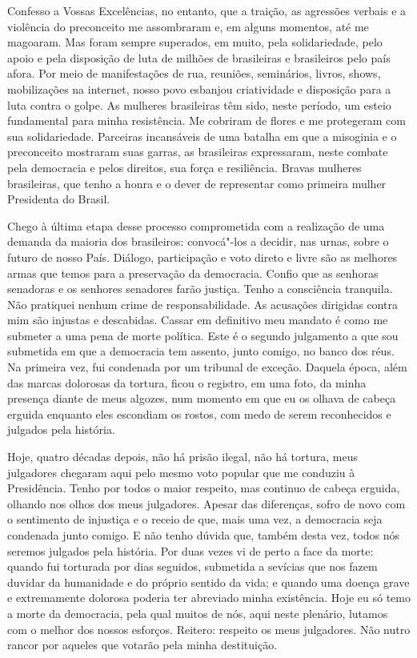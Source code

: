 Confesso a Vossas Excelências, no entanto, que a traição, as agressões
verbais e a violência do preconceito me assombraram e, em alguns
momentos, até me magoaram. Mas foram sempre superados, em muito, pela
solidariedade, pelo apoio e pela disposição de luta de milhões de
brasileiras e brasileiros pelo país afora. Por meio de manifestações de
rua, reuniões, seminários, livros, shows, mobilizações na internet,
nosso povo esbanjou criatividade e disposição para a luta contra o
golpe. As mulheres brasileiras têm sido, neste período, um esteio
fundamental para minha resistência. Me cobriram de flores e me
protegeram com sua solidariedade. Parceiras incansáveis de uma batalha
em que a misoginia e o preconceito mostraram suas garras, as brasileiras
expressaram, neste combate pela democracia e pelos direitos, sua força e
resiliência. Bravas mulheres brasileiras, que tenho a honra e o dever de
representar como primeira mulher Presidenta do Brasil.

Chego à última
etapa desse processo comprometida com a realização de uma demanda da
maioria dos brasileiros: convocá"-los a decidir, nas urnas, sobre o
futuro de nosso País. Diálogo, participação e voto direto e livre são as
melhores armas que temos para a preservação da democracia. Confio que as
senhoras senadoras e os senhores senadores farão justiça. Tenho a
consciência tranquila. Não pratiquei nenhum crime de responsabilidade.
As acusações dirigidas contra mim são injustas e descabidas. Cassar em
definitivo meu mandato é como me submeter a uma pena de morte política.
Este é o segundo julgamento a que sou submetida em que a democracia tem
assento, junto comigo, no banco dos réus. Na primeira vez, fui condenada
por um tribunal de exceção. Daquela época, além das marcas dolorosas da
tortura, ficou o registro, em uma foto, da minha presença diante de meus
algozes, num momento em que eu os olhava de cabeça erguida enquanto eles
escondiam os rostos, com medo de serem reconhecidos e julgados pela
história.

Hoje, quatro décadas depois, não há prisão ilegal, não há
tortura, meus julgadores chegaram aqui pelo mesmo voto popular que me
conduziu à Presidência. Tenho por todos o maior respeito, mas continuo
de cabeça erguida, olhando nos olhos dos meus julgadores. Apesar das
diferenças, sofro de novo com o sentimento de injustiça e o receio de
que, mais uma vez, a democracia seja condenada junto comigo. E não tenho
dúvida que, também desta vez, todos nós seremos julgados pela história.
Por duas vezes vi de perto a face da morte: quando fui torturada por
dias seguidos, submetida a sevícias que nos fazem duvidar da humanidade
e do próprio sentido da vida; e quando uma doença grave e extremamente
dolorosa poderia ter abreviado minha existência. Hoje eu só temo a morte
da democracia, pela qual muitos de nós, aqui neste plenário, lutamos com
o melhor dos nossos esforços. Reitero: respeito os meus julgadores. Não
nutro rancor por aqueles que votarão pela minha destituição.

